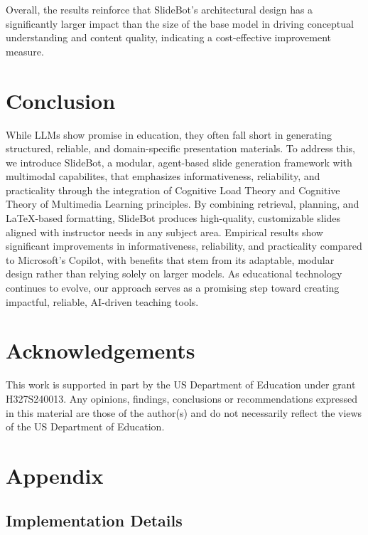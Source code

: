 \documentclass[letterpaper]{article} %
\begin{document}
Overall, the results reinforce that SlideBot's architectural design has a significantly larger impact than the size of the base model in driving conceptual understanding and content quality, indicating a cost-effective improvement measure.


\section{Conclusion}
While LLMs show promise in education, they often fall short in generating structured, reliable, and domain-specific presentation materials. To address this, we introduce SlideBot, a modular, agent-based slide generation framework with multimodal capabilites, that emphasizes informativeness, reliability, and practicality through the integration of Cognitive Load Theory and Cognitive Theory of Multimedia Learning principles. By combining retrieval, planning, and LaTeX-based formatting, SlideBot produces high-quality, customizable slides aligned with instructor needs in any subject area. Empirical results show significant improvements in informativeness, reliability, and practicality compared to Microsoft's Copilot, with benefits that stem from its adaptable, modular design rather than relying solely on larger models. As educational technology continues to evolve, our approach serves as a promising step toward creating impactful, reliable, AI-driven teaching tools.

\section*{Acknowledgements}
This work is supported in part by the US Department of Education under grant H327S240013.  Any opinions, findings, conclusions or recommendations expressed in this material are those of the
author(s) and do not necessarily reflect the views of the US Department of Education.

% 
% 


\newpage
\appendix


\section{Appendix}
\label{sec:appendix}

\subsection{Implementation Details}
\end{document}
